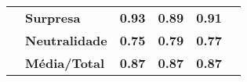 \begin{table}[]
\begin{tabular}{llcccc}
                                       & \textbf{Surpresa}     & \textbf{0.93}                & \textbf{0.89}                 & \textbf{0.91}                &                                \\
                                       & \textbf{Neutralidade} & \textbf{0.75}                & \textbf{0.79}                 & \textbf{0.77}                &                                \\
                                       & \textbf{Média/Total}  & \textbf{0.87}                & \textbf{0.87}                 & \textbf{0.87}                &                                \\ \hline
\end{tabular}
\end{table}



